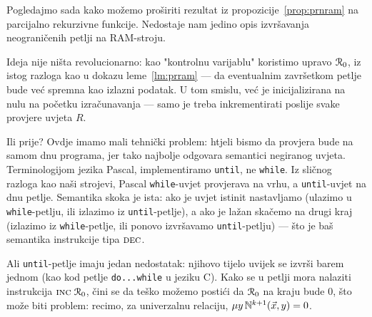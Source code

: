 

Pogledajmo sada kako možemo proširiti rezultat iz propozicije~\ref{prop:prnram} na parcijalno rekurzivne funkcije. Nedostaje nam jedino opis izvršavanja neograničenih petlji na RAM-stroju.

Ideja nije ništa revolucionarno: kao "kontrolnu varijablu" koristimo upravo $\mathcal R_{0}$, iz istog razloga kao u dokazu leme~\ref{lm:prram} --- da eventualnim završetkom petlje bude već spremna kao izlazni podatak. U tom smislu, već je inicijalizirana na nulu na početku izračunavanja --- samo je treba inkrementirati poslije svake provjere uvjeta $R$.

Ili prije? Ovdje imamo mali tehnički problem: htjeli bismo da provjera bude na samom dnu programa, jer tako najbolje odgovara semantici negiranog uvjeta. Terminologijom jezika Pascal, implementiramo \texttt{until}, ne \texttt{while}. Iz sličnog razloga kao naši strojevi, Pascal \texttt{while}-uvjet provjerava na vrhu, a \texttt{until}-uvjet na dnu petlje. Semantika skoka je ista: ako je uvjet istinit nastavljamo (ulazimo u \texttt{while}-petlju, ili izlazimo iz \texttt{until}-petlje), a ako je lažan skačemo na drugi kraj (izlazimo iz \texttt{while}-petlje, ili ponovo izvršavamo \texttt{until}-petlju) --- što je baš semantika instrukcije tipa $\textsc{dec}$.

Ali \texttt{until}-petlje imaju jedan nedostatak: njihovo tijelo uvijek se izvrši barem jednom (kao kod petlje \texttt{do...while} u jeziku C). Kako se u petlji mora nalaziti instrukcija $\textsc{inc}\;\mathcal R_{0}$, čini se da teško možemo postići da $\mathcal R_{0}$ na kraju bude $0$, što može biti problem: recimo, za univerzalnu relaciju, $\mu y\,{\mathbb N}^{k+1}(\vec x,y)=0$.


